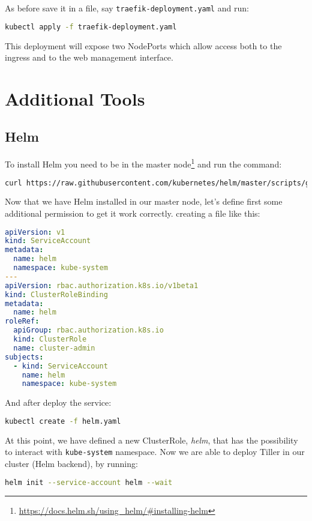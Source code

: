 As before save it in a file, say \texttt{traefik-deployment.yaml} and run:

\begin{lstlisting}[language=bash]
kubectl apply -f traefik-deployment.yaml
\end{lstlisting}

This deployment will expose two NodePorts which allow access both to the
ingress and to the web management interface.

\section{Additional Tools}\label{additional-tools}

\subsection{Helm}\label{helm}

To install Helm you need to be in the master node\footnote{
\url{https://docs.helm.sh/using_helm/\#installing-helm}} and run the
command:
\begin{lstlisting}[language=bash]
curl https://raw.githubusercontent.com/kubernetes/helm/master/scripts/get | bash
\end{lstlisting}

Now that we have Helm installed in our master node, let's define first
some additional permission to get it work correctly. creating a file like this:

\begin{lstlisting}[language=yaml]
apiVersion: v1
kind: ServiceAccount
metadata:
  name: helm
  namespace: kube-system
---
apiVersion: rbac.authorization.k8s.io/v1beta1
kind: ClusterRoleBinding
metadata:
  name: helm
roleRef:
  apiGroup: rbac.authorization.k8s.io
  kind: ClusterRole
  name: cluster-admin
subjects:
  - kind: ServiceAccount
    name: helm
    namespace: kube-system
\end{lstlisting}

And after deploy the service:

\begin{lstlisting}[language=bash]
kubectl create -f helm.yaml
\end{lstlisting}

At this point, we have defined a new ClusterRole, \emph{helm}, that has
the possibility to interact with \texttt{kube-system} namespace. Now
we are able to deploy Tiller in our cluster (Helm backend), by running:

\begin{lstlisting}[language=bash]
 helm init --service-account helm --wait
 \end{lstlisting}
